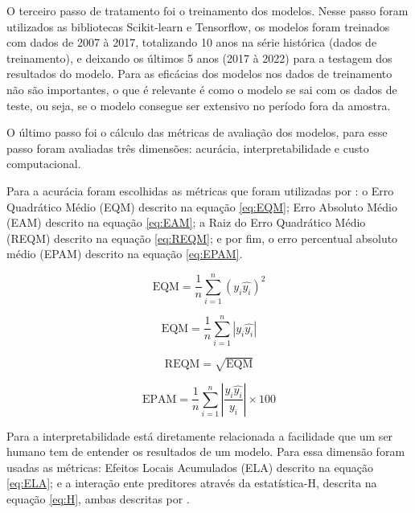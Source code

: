 \documentclass[12pt]{article}%
\begin{document}
	O terceiro passo de tratamento foi o treinamento dos modelos. Nesse passo foram utilizados as bibliotecas Scikit-learn e Tensorflow, os modelos foram treinados com dados de 2007 à 2017, totalizando 10 anos na série histórica (dados de treinamento), e deixando os últimos 5 anos (2017 à 2022) para a testagem dos resultados do modelo. Para  as eficácias dos modelos nos dados de treinamento não são importantes, o que é relevante é como o modelo se sai com os dados de teste, ou seja, se o modelo consegue ser extensivo no período fora da amostra.
	
	O último passo foi o cálculo das métricas de avaliação dos modelos, para esse passo foram avaliadas três dimensões: acurácia, interpretabilidade e custo computacional.
	
	Para a acurácia foram escolhidas as métricas que foram utilizadas por : o  Erro Quadrático Médio (EQM) descrito na equação \ref{eq:EQM}; Erro Absoluto Médio (EAM) descrito na equação \ref{eq:EAM}; a Raiz do Erro Quadrático Médio (REQM) descrito na equação \ref{eq:REQM}; e por fim, o erro percentual absoluto médio (EPAM) descrito na equação \ref{eq:EPAM}.
	
	\begin{equation}
		\label{eq:EQM}
		\text{EQM} = \frac{1}{n}\sum_{i=1}^{n}(y_i \hat{y_i})^2
	\end{equation}
	
	\begin{equation}
		\label{eq:EAM}
		\text{EQM} = \frac{1}{n}\sum_{i=1}^{n}|y_i \hat{y_i}|
	\end{equation}
	
	\begin{equation}
		\label{eq:REQM}
		\text{REQM} = \sqrt{\text{EQM}}
	\end{equation}
	
	\begin{equation}
		\label{eq:EPAM}
		\text{EPAM} = \frac{1}{n}\sum_{i=1}^{n}|\frac{y_i \hat{y_i}}{y_i}| \times 100
	\end{equation}
	
	Para  a interpretabilidade está diretamente relacionada a facilidade que um ser humano tem de entender os resultados de um modelo. Para essa dimensão foram usadas as métricas: Efeitos Locais Acumulados (ELA) descrito na equação \ref{eq:ELA}; e a interação ente preditores através da estatística-H, descrita na equação \ref{eq:H}, ambas descritas por .
	
\end{document}
